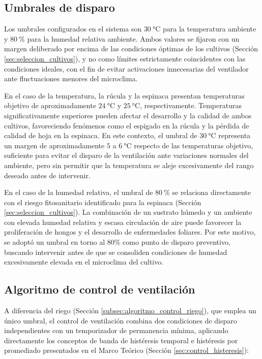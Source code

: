 \subsection{Umbrales de disparo}
\label{subsec:umbral_ventilacion}

Los umbrales configurados en el sistema son $\SI{30}{\celsius}$ para la temperatura ambiente y $\SI{80}{\percent}$ para la humedad relativa ambiente. Ambos valores se fijaron con un margen deliberado por encima de las condiciones óptimas de los cultivos (Sección \ref{sec:seleccion_cultivos}), y no como límites estrictamente coincidentes con las condiciones ideales, con el fin de evitar activaciones innecesarias del ventilador ante fluctuaciones menores del microclima.

En el caso de la temperatura, la rúcula y la espinaca presentan temperaturas objetivo de aproximadamente $\SI{24}{\celsius}$ y $\SI{25}{\celsius}$, respectivamente. Temperaturas significativamente superiores pueden afectar el desarrollo y la calidad de ambos cultivos, favoreciendo fenómenos como el espigado en la rúcula y la pérdida de calidad de hoja en la espinaca. En este contexto, el umbral de $\SI{30}{\celsius}$ representa un margen de aproximadamente $5$ a $\SI{6}{\celsius}$ respecto de las temperaturas objetivo, suficiente para evitar el disparo de la ventilación ante variaciones normales del ambiente, pero sin permitir que la temperatura se aleje excesivamente del rango deseado antes de intervenir.

En el caso de la humedad relativa, el umbral de $\SI{80}{\percent}$ se relaciona directamente con el riesgo fitosanitario identificado para la espinaca (Sección \ref{sec:seleccion_cultivos}). La combinación de un sustrato húmedo y un ambiente con elevada humedad relativa y escasa circulación de aire puede favorecer la proliferación de hongos y el desarrollo de enfermedades foliares. Por este motivo, se adoptó un umbral en torno al $80\%$ como punto de disparo preventivo, buscando intervenir antes de que se consoliden condiciones de humedad excesivamente elevada en el microclima del cultivo.

\subsection{Algoritmo de control de ventilación}
\label{subsec:algoritmo_control_ventilacion}

A diferencia del riego (Sección \ref{subsec:algoritmo_control_riego}), que emplea un único umbral, el control de ventilación combina dos condiciones de disparo independientes con un temporizador de permanencia mínima, aplicando directamente los conceptos de banda de histéresis temporal e histéresis por promediado presentados en el Marco Teórico (Sección \ref{sec:control_histeresis}):

